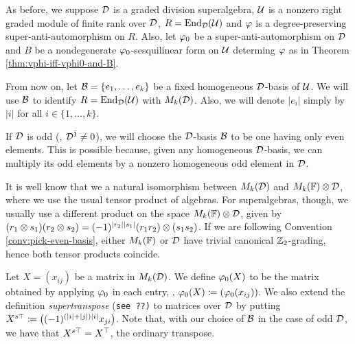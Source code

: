 As before, we suppose $\mathcal{D}$ is a graded division superalgebra, $\mathcal U$ is a nonzero right graded module of finite rank over $\mathcal{D}$, $R = \operatorname{End}_{\mathcal{D}} (\mathcal U)$ and $\varphi$ is a degree-preserving super-anti-automorphism on $R$. 
Also, let $\varphi_0$ be a super-anti-automorphism on $\mathcal{D}$ and $B$ be a nondegenerate $\varphi_0$-sesquilinear form on $\mathcal U$ determing $\varphi$ as in Theorem \ref{thm:vphi-iff-vphi0-and-B}.

From now on, let $\mathcal B = \{e_1, \ldots, e_k\}$ be a fixed homogeneous $\mathcal{D}$-basis of $\mathcal U$. 
We will use $\mathcal B$ to identify $R = \operatorname{End}_{\mathcal{D}} (\mathcal U)$ with $M_k (\mathcal{D})$. 
Also, we will denote $|e_i|$ simply by $|i|$ for all $i \in \{1, \ldots, k\}$. 


\begin{convention}\label{conv:pick-even-basis}
    If $\mathcal{D}$ is odd (\ie, $\mathcal{D}^{\bar1} \neq 0$), we will choose the $\mathcal{D}$-basis $\mathcal B$ to be one having only even elements. 
    This is possible because, given any homogeneous $\mathcal{D}$-basis, we can multiply its odd elements by a nonzero homogeneous odd element in $\mathcal{D}$. 
\end{convention}

\begin{remark}
    It is well know that we a natural isomorphism between $M_k(\mathcal{D})$ and $M_k(\mathbb{F})\otimes \mathcal{D}$, where we use the usual tensor product of algebras. 
    For superalgebras, though, we usually use a different product on the space $M_k(\mathbb{F})\otimes \mathcal{D}$, given by $(r_1 \otimes s_1) (r_2 \otimes s_2) = (-1)^{|r_2||s_1|} (r_1 r_2) \otimes (s_1 s_2)$. 
    If we are following Convention \ref{conv:pick-even-basis}, either $M_k(\mathbb{F})$ or $\mathcal{D}$ have trivial canonical $\mathbb{Z}_2$-grading, hence both tensor products coincide.
\end{remark}

\begin{defi}
    Let $X = (x_{ij})$ be a matrix in $M_k (\mathcal{D})$. 
    We define $\varphi_0 (X)$ to be the matrix obtained by applying $\varphi_0$ in each entry, \ie, $\varphi_0 (X) \coloneqq (\varphi_0(x_{ij}))$. 
    We also extend the definition \emph{supertranspose} {(\tt see ??)} to matrices over $\mathcal{D}$ by putting $X^{s\top} \coloneqq \big((-1)^{(|i| + |j|) |i|} x_{ji} \big)$. 
    Note that, with our choice of $\mathcal B$ in the case of odd $\mathcal{D}$, we have that $X^{s\top} = X^{\top}$, the ordinary transpose.
\end{defi}

